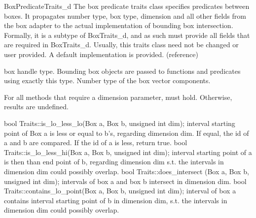 
\ccRefPageBegin
\begin{ccRefConcept}{BoxPredicateTraits_d}
The box predicate traits class specifies predicates between boxes. It propagates number type, box type, dimension and all other fields from the box adapter to the actual implementation of bounding box intersection. Formally, it is a subtype of BoxTraits\_d, and as such must provide all fields that are required in BoxTraits\_d. Usually, this traits class need not be changed or user provided. A default implementation is provided. (reference)

\ccTypes
{} {box handle type. Bounding box objects are passed to functions and predicates using exactly this type.}
  {Number type of the box vector components.}



\ccOperations
For all methods that require a dimension parameter,  must hold. Otherwise, results are undefined.

\ccMethod
  {bool Traits::is_lo_less_lo(Box a, Box b, unsigned int dim);}
  {interval starting point of Box a is less or equal to b's, regarding dimension dim. If equal, the id of a and b are compared. If the id of a is less, return true.}
\ccMethod
  {bool Traits::is_lo_less_hi(Box a, Box b, unsigned int dim);}
  {interval starting point of a is then than end point of b, regarding dimension dim s.t. the intervals in dimension dim could possibly overlap.}
\ccMethod
  {bool Traits::does_intersect (Box a, Box b, unsigned int dim);}
  {intervals of box a and box b intersect in dimension dim.}
\ccMethod
  {bool Traits::contains_lo_point(Box a, Box b, unsigned int dim);}
  {interval of box a contains interval starting point of b in dimension dim, s.t. the intervals in dimension dim could possibly overlap.}

\ccHasModels
{}

\end{ccRefConcept}

\ccRefPageEnd

